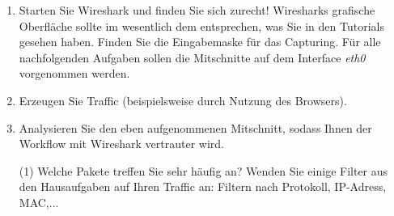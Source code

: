 \documentclass[paper=a4,fontsize=11pt]{scrartcl}%
\begin{document}
\begin{enumerate}
	\item Starten Sie Wireshark und finden Sie sich zurecht! Wiresharks grafische Oberfläche sollte im wesentlich dem entsprechen, was Sie in den Tutorials gesehen haben. Finden Sie die Eingabemaske für das Capturing. Für alle nachfolgenden Aufgaben sollen die Mitschnitte auf dem Interface \emph{eth0} vorgenommen werden. 
	\item Erzeugen Sie Traffic (beispielsweise durch Nutzung des Browsers).
	\item Analysieren Sie den eben aufgenommenen Mitschnitt, sodass Ihnen der Workflow mit Wireshark vertrauter wird.
	\begin{tasks}(1)
		\task Welche Pakete treffen Sie sehr häufig an?
		\task Wenden Sie einige Filter aus den Hausaufgaben auf Ihren Traffic an: Filtern nach Protokoll, IP-Adress, MAC,...
	\end{tasks}
\end{enumerate}
\end{document}
